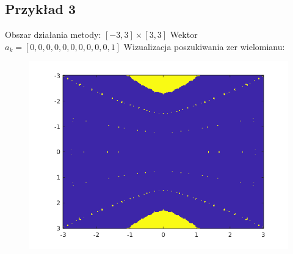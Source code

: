\documentclass[10pt]{article}   %
\begin{document}
\subsection{Przykład 3}
Obszar działania metody: $[-3,3]\times[3,3]$\newline
Wektor $a_k=[0,0,0,0,0,0,0,0,0,0,1]$\newline
Wizualizacja poszukiwania zer wielomianu:\newline

\begin{figure}[ht]
\begin{center}
\advance\leftskip-3cm
\advance\rightskip-3cm
\includegraphics[keepaspectratio=true,scale=0.6]{map4.png}\newline
\end{center}\end{figure}
\newpage
\end{document}
